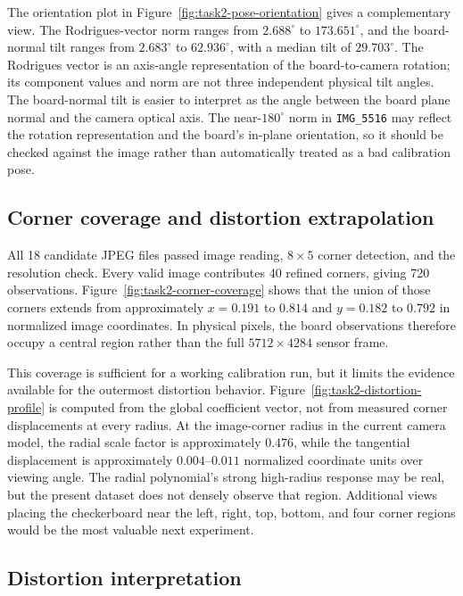 The orientation plot in Figure~\ref{fig:task2-pose-orientation} gives a complementary view. The Rodrigues-vector norm ranges from \(2.688^\circ\) to \(173.651^\circ\), and the board-normal tilt ranges from \(2.683^\circ\) to \(62.936^\circ\), with a median tilt of \(29.703^\circ\). The Rodrigues vector is an axis-angle representation of the board-to-camera rotation; its component values and norm are not three independent physical tilt angles. The board-normal tilt is easier to interpret as the angle between the board plane normal and the camera optical axis. The near-\(180^\circ\) norm in \texttt{IMG\_5516} may reflect the rotation representation and the board's in-plane orientation, so it should be checked against the image rather than automatically treated as a bad calibration pose.

\subsection{Corner coverage and distortion extrapolation}

All 18 candidate JPEG files passed image reading, \(8\times5\) corner detection, and the resolution check. Every valid image contributes 40 refined corners, giving 720 observations. Figure~\ref{fig:task2-corner-coverage} shows that the union of those corners extends from approximately \(x=0.191\) to \(0.814\) and \(y=0.182\) to \(0.792\) in normalized image coordinates. In physical pixels, the board observations therefore occupy a central region rather than the full \(5712\times4284\) sensor frame.

This coverage is sufficient for a working calibration run, but it limits the evidence available for the outermost distortion behavior. Figure~\ref{fig:task2-distortion-profile} is computed from the global coefficient vector, not from measured corner displacements at every radius. At the image-corner radius in the current camera model, the radial scale factor is approximately \(0.476\), while the tangential displacement is approximately \(0.004\)--\(0.011\) normalized coordinate units over viewing angle. The radial polynomial's strong high-radius response may be real, but the present dataset does not densely observe that region. Additional views placing the checkerboard near the left, right, top, bottom, and four corner regions would be the most valuable next experiment.

\subsection{Distortion interpretation}

